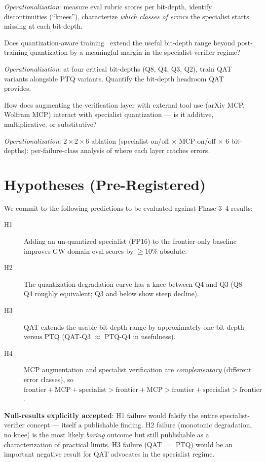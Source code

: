 \documentclass[11pt]{article}
\begin{document}
\textit{Operationalization}: measure eval rubric scores per bit-depth, identify discontinuities (``knees''), characterize \emph{which classes of errors} the specialist starts missing at each bit-depth.

Does quantization-aware training~\cite{liu2023llmqat} extend the useful bit-depth range beyond post-training quantization by a meaningful margin in the specialist-verifier regime?

\textit{Operationalization}: at four critical bit-depths (Q8, Q4, Q3, Q2), train QAT variants alongside PTQ variants. Quantify the bit-depth headroom QAT provides.

How does augmenting the verification layer with external tool use (arXiv MCP, Wolfram MCP) interact with specialist quantization --- is it additive, multiplicative, or substitutive?

\textit{Operationalization}: $2 \times 2 \times 6$ ablation (specialist on/off $\times$ MCP on/off $\times$ 6 bit-depths); per-failure-class analysis of where each layer catches errors.

\section{Hypotheses (Pre-Registered)}

We commit to the following predictions to be evaluated against Phase 3--4 results:

\begin{description}
  \item[H1] Adding an un-quantized specialist (FP16) to the frontier-only baseline improves GW-domain eval scores by $\geq$10\% absolute.
  \item[H2] The quantization-degradation curve has a knee between Q4 and Q3 (Q8--Q4 roughly equivalent; Q3 and below show steep decline).
  \item[H3] QAT extends the usable bit-depth range by approximately one bit-depth versus PTQ (QAT-Q3 $\approx$ PTQ-Q4 in usefulness).
  \item[H4] MCP augmentation and specialist verification are \emph{complementary} (different error classes), so $\text{frontier}{+}\text{MCP}{+}\text{specialist} > \text{frontier}{+}\text{MCP} > \text{frontier}{+}\text{specialist} > \text{frontier}$.
\end{description}

\textbf{Null-results explicitly accepted}: H1 failure would falsify the entire specialist-verifier concept --- itself a publishable finding. H2 failure (monotonic degradation, no knee) is the most likely \emph{boring} outcome but still publishable as a characterization of practical limits. H3 failure (QAT $=$ PTQ) would be an important negative result for QAT advocates in the specialist regime.
\end{document}
